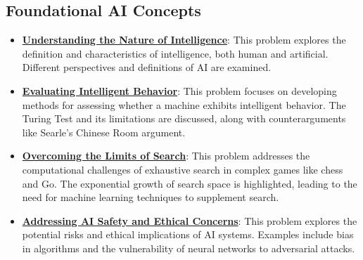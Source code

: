 \documentclass{article}%
\begin{document}
\subsection{Foundational AI Concepts}%
\label{subsec:FoundationalAIConcepts}%
\begin{itemize}[leftmargin=*]%
\item \href{https://purdue.brightspace.com/d2l/common/assets/pdfjs-d2l-dist/1.0.14-legacy/web/viewer.html?file=\%2Fcontent\%2Fenforced\%2F1095467-wl.202510.CS.24300.001\%2F02L2-Intro.pdf\%3Fou\%3D1095467\&lang=en-us\&container=d2l-fileviewer-rendered-pdf\&fullscreen=d2l-fileviewer-rendered-pdf-dialog\&height=667#page=5}{\textbf{Understanding the Nature of Intelligence}}: This problem explores the definition and characteristics of intelligence, both human and artificial. Different perspectives and definitions of AI are examined.%
\item \href{https://purdue.brightspace.com/d2l/common/assets/pdfjs-d2l-dist/1.0.14-legacy/web/viewer.html?file=\%2Fcontent\%2Fenforced\%2F1095467-wl.202510.CS.24300.001\%2F02L2-Intro.pdf\%3Fou\%3D1095467\&lang=en-us\&container=d2l-fileviewer-rendered-pdf\&fullscreen=d2l-fileviewer-rendered-pdf-dialog\&height=667#page=6}{\textbf{Evaluating Intelligent Behavior}}: This problem focuses on developing methods for assessing whether a machine exhibits intelligent behavior. The Turing Test and its limitations are discussed, along with counterarguments like Searle's Chinese Room argument.%
\item \href{https://purdue.brightspace.com/d2l/common/assets/pdfjs-d2l-dist/1.0.14-legacy/web/viewer.html?file=\%2Fcontent\%2Fenforced\%2F1095467-wl.202510.CS.24300.001\%2F02L2-Intro.pdf\%3Fou\%3D1095467\&lang=en-us\&container=d2l-fileviewer-rendered-pdf\&fullscreen=d2l-fileviewer-rendered-pdf-dialog\&height=667#page=11}{\textbf{Overcoming the Limits of Search}}: This problem addresses the computational challenges of exhaustive search in complex games like chess and Go. The exponential growth of search space is highlighted, leading to the need for machine learning techniques to supplement search.%
\item \href{https://purdue.brightspace.com/d2l/common/assets/pdfjs-d2l-dist/1.0.14-legacy/web/viewer.html?file=\%2Fcontent\%2Fenforced\%2F1095467-wl.202510.CS.24300.001\%2F02L2-Intro.pdf\%3Fou\%3D1095467\&lang=en-us\&container=d2l-fileviewer-rendered-pdf\&fullscreen=d2l-fileviewer-rendered-pdf-dialog\&height=667#page=19}{\textbf{Addressing AI Safety and Ethical Concerns}}: This problem explores the potential risks and ethical implications of AI systems. Examples include bias in algorithms and the vulnerability of neural networks to adversarial attacks.%

\end{itemize}
\end{document}
